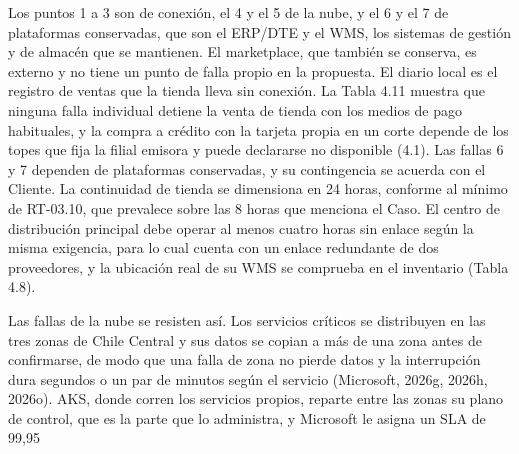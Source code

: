 \documentclass[11pt]{article}
\begin{document}
Los puntos 1 a 3 son de conexión, el 4 y el 5 de la nube, y el 6 y el 7 de plataformas conservadas, que son el ERP/DTE y el WMS, los sistemas de gestión y de almacén que se mantienen. El marketplace, que también se conserva, es externo y no tiene un punto de falla propio en la propuesta. El diario local es el registro de ventas que la tienda lleva sin conexión. La Tabla 4.11 muestra que ninguna falla individual detiene la venta de tienda con los medios de pago habituales, y la compra a crédito con la tarjeta propia en un corte depende de los topes que fija la filial emisora y puede declararse no disponible (4.1). Las fallas 6 y 7 dependen de plataformas conservadas, y su contingencia se acuerda con el Cliente. La continuidad de tienda se dimensiona en 24 horas, conforme al mínimo de RT-03.10, que prevalece sobre las 8 horas que menciona el Caso. El centro de distribución principal debe operar al menos cuatro horas sin enlace según la misma exigencia, para lo cual cuenta con un enlace redundante de dos proveedores, y la ubicación real de su WMS se comprueba en el inventario (Tabla 4.8).

Las fallas de la nube se resisten así. Los servicios críticos se distribuyen en las tres zonas de Chile Central y sus datos se copian a más de una zona antes de confirmarse, de modo que una falla de zona no pierde datos y la interrupción dura segundos o un par de minutos según el servicio (Microsoft, 2026g, 2026h, 2026o). AKS, donde corren los servicios propios, reparte entre las zonas su plano de control, que es la parte que lo administra, y Microsoft le asigna un SLA de 99,95 %
\end{document}
